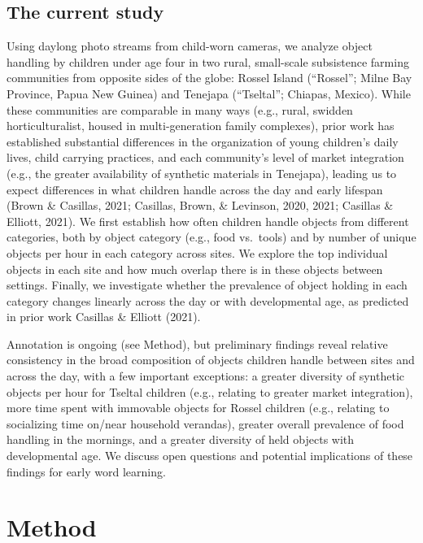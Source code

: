 \documentclass[10pt, letterpaper]{article}
\begin{document}
\hypertarget{the-current-study}{%
\subsection{The current study}\label{the-current-study}}

Using daylong photo streams from child-worn cameras, we analyze object
handling by children under age four in two rural, small-scale
subsistence farming communities from opposite sides of the globe: Rossel
Island (``Rossel''; Milne Bay Province, Papua New Guinea) and Tenejapa
(``Tseltal''; Chiapas, Mexico). While these communities are comparable
in many ways (e.g., rural, swidden horticulturalist, housed in
multi-generation family complexes), prior work has established
substantial differences in the organization of young children's daily
lives, child carrying practices, and each community's level of market
integration (e.g., the greater availability of synthetic materials in
Tenejapa), leading us to expect differences in what children handle
across the day and early lifespan (Brown \& Casillas, 2021; Casillas,
Brown, \& Levinson, 2020, 2021; Casillas \& Elliott, 2021). We first
establish how often children handle objects from different categories,
both by object category (e.g., food vs.~tools) and by number of unique
objects per hour in each category across sites. We explore the top
individual objects in each site and how much overlap there is in these
objects between settings. Finally, we investigate whether the prevalence
of object holding in each category changes linearly across the day or
with developmental age, as predicted in prior work Casillas \& Elliott
(2021).

Annotation is ongoing (see Method), but preliminary findings reveal
relative consistency in the broad composition of objects children handle
between sites and across the day, with a few important exceptions: a
greater diversity of synthetic objects per hour for Tseltal children
(e.g., relating to greater market integration), more time spent with
immovable objects for Rossel children (e.g., relating to socializing
time on/near household verandas), greater overall prevalence of food
handling in the mornings, and a greater diversity of held objects with
developmental age. We discuss open questions and potential implications
of these findings for early word learning.

\hypertarget{method}{%
\section{Method}\label{method}}
\end{document}
